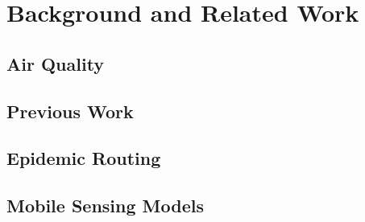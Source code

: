 \chapter{Background and Related Work}\label{background}
\section{Air Quality}\label{background_airquality}
\section{Previous Work}\label{background_previous_work}
\section{Epidemic Routing}\label{background_epidemic_routing}

\section{Mobile Sensing Models}\label{background_mobile_sensing_models}

